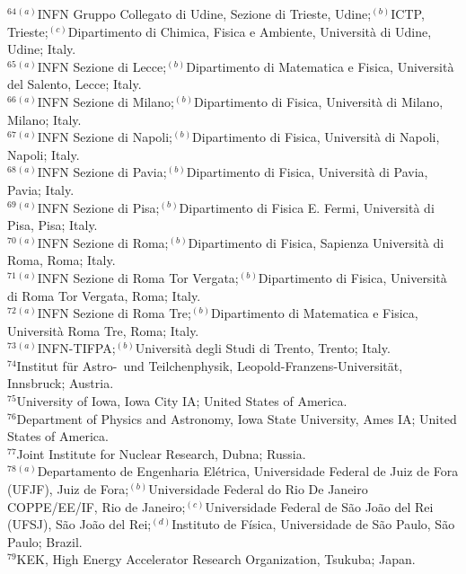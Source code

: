 \begin{flushleft}
$^{64}$$^{(a)}$INFN Gruppo Collegato di Udine, Sezione di Trieste, Udine;$^{(b)}$ICTP, Trieste;$^{(c)}$Dipartimento di Chimica, Fisica e Ambiente, Universit\`a di Udine, Udine; Italy.\\
$^{65}$$^{(a)}$INFN Sezione di Lecce;$^{(b)}$Dipartimento di Matematica e Fisica, Universit\`a del Salento, Lecce; Italy.\\
$^{66}$$^{(a)}$INFN Sezione di Milano;$^{(b)}$Dipartimento di Fisica, Universit\`a di Milano, Milano; Italy.\\
$^{67}$$^{(a)}$INFN Sezione di Napoli;$^{(b)}$Dipartimento di Fisica, Universit\`a di Napoli, Napoli; Italy.\\
$^{68}$$^{(a)}$INFN Sezione di Pavia;$^{(b)}$Dipartimento di Fisica, Universit\`a di Pavia, Pavia; Italy.\\
$^{69}$$^{(a)}$INFN Sezione di Pisa;$^{(b)}$Dipartimento di Fisica E. Fermi, Universit\`a di Pisa, Pisa; Italy.\\
$^{70}$$^{(a)}$INFN Sezione di Roma;$^{(b)}$Dipartimento di Fisica, Sapienza Universit\`a di Roma, Roma; Italy.\\
$^{71}$$^{(a)}$INFN Sezione di Roma Tor Vergata;$^{(b)}$Dipartimento di Fisica, Universit\`a di Roma Tor Vergata, Roma; Italy.\\
$^{72}$$^{(a)}$INFN Sezione di Roma Tre;$^{(b)}$Dipartimento di Matematica e Fisica, Universit\`a Roma Tre, Roma; Italy.\\
$^{73}$$^{(a)}$INFN-TIFPA;$^{(b)}$Universit\`a degli Studi di Trento, Trento; Italy.\\
$^{74}$Institut f\"{u}r Astro-~und Teilchenphysik, Leopold-Franzens-Universit\"{a}t, Innsbruck; Austria.\\
$^{75}$University of Iowa, Iowa City IA; United States of America.\\
$^{76}$Department of Physics and Astronomy, Iowa State University, Ames IA; United States of America.\\
$^{77}$Joint Institute for Nuclear Research, Dubna; Russia.\\
$^{78}$$^{(a)}$Departamento de Engenharia El\'etrica, Universidade Federal de Juiz de Fora (UFJF), Juiz de Fora;$^{(b)}$Universidade Federal do Rio De Janeiro COPPE/EE/IF, Rio de Janeiro;$^{(c)}$Universidade Federal de S\~ao Jo\~ao del Rei (UFSJ), S\~ao Jo\~ao del Rei;$^{(d)}$Instituto de F\'isica, Universidade de S\~ao Paulo, S\~ao Paulo; Brazil.\\
$^{79}$KEK, High Energy Accelerator Research Organization, Tsukuba; Japan.\\
$$
\end{flushleft}
